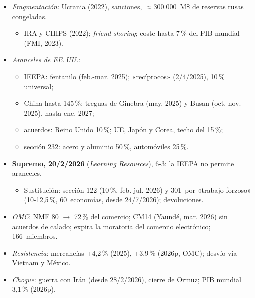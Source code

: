 \documentclass{article}
\begin{document}
\begin{columnas}
\begin{itemize}
\item \emph{Fragmentación}: Ucrania (2022), sanciones, $\approx$300.000~M\$ de reservas rusas congeladas.
  \begin{itemize}
  \item IRA y CHIPS (2022); \emph{friend-shoring}; coste hasta 7\,\% del PIB mundial (FMI, 2023).
  \end{itemize}
\item \emph{Aranceles de EE.\,UU.}:
  \begin{itemize}
  \item IEEPA: fentanilo (feb.-mar. 2025); «recíprocos» (2/4/2025), 10\,\% universal;
  \item China hasta 145\,\%; treguas de Ginebra (may. 2025) y Busan (oct.-nov. 2025), hasta ene. 2027;
  \item acuerdos: Reino Unido 10\,\%; UE, Japón y Corea, techo del 15\,\%;
  \item sección 232: acero y aluminio 50\,\%, automóviles 25\,\%.
  \end{itemize}
\item \textbf{Supremo, 20/2/2026} (\emph{Learning Resources}), 6-3: la IEEPA no permite aranceles.
  \begin{itemize}
  \item Sustitución: sección 122 (10\,\%, feb.-jul. 2026) y 301~por «trabajo forzoso» (10-12,5\,\%, 60~economías, desde 24/7/2026); devoluciones.
  \end{itemize}
\end{itemize}
\begin{itemize}
\item \emph{OMC}: NMF 80 $\to$ 72\,\% del comercio; CM14 (Yaundé, mar. 2026) sin acuerdos de calado; expira la moratoria del comercio electrónico; 166~miembros.
\item \emph{Resistencia}: mercancías +4,2\,\% (2025), +3,9\,\% (2026p, OMC); desvío vía Vietnam y México.
\item \emph{Choque}: guerra con Irán (desde 28/2/2026), cierre de Ormuz; PIB mundial 3,1\,\% (2026p).
\end{itemize}


\end{columnas}
\end{document}
